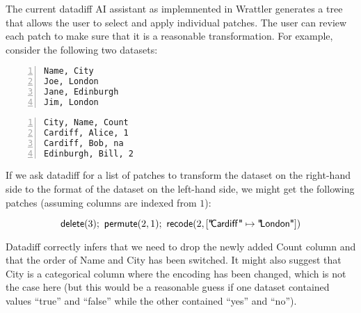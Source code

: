 \documentclass{article}
\begin{document}
The current datadiff AI assistant as implemnented in Wrattler generates a tree that allows the
user to select and apply individual patches. The user can review each patch to make sure that it
is a reasonable transformation. For example, consider the following two datasets:

\vspace{0.5em}
\begin{minipage}[t]{0.5\textwidth}
\begin{Verbatim}[numbers=left,xleftmargin=3mm]
Name, City
Joe, London
Jane, Edinburgh
Jim, London
\end{Verbatim}
\end{minipage}
\begin{minipage}[t]{0.5\textwidth}
\begin{Verbatim}[numbers=left,xleftmargin=3mm]
City, Name, Count
Cardiff, Alice, 1
Cardiff, Bob, na
Edinburgh, Bill, 2
\end{Verbatim}
\end{minipage}
\vspace{1em}

\noindent
If we ask datadiff for a list of patches to transform the dataset on the right-hand side
to the format of the dataset on the left-hand side, we might get the following patches
(assuming columns are indexed from $1$):

\[
\textnormal{\sffamily delete}(3);~ \textnormal{\sffamily permute}(2,1);~ \textnormal{\sffamily recode}(2, [\textnormal{\sffamily "\hspace{-0.2em}Cardiff\hspace{0.1em}"}\mapsto\textnormal{\sffamily "\hspace{-0.2em}London"}])
\]

\noindent
Datadiff correctly infers that we need to drop the newly added {\ttfamily Count} column and that
the order of {\ttfamily Name} and {\ttfamily City} has been switched. It might also suggest that
{\ttfamily City} is a categorical column where the encoding has been changed, which is not the 
case here (but this would be a reasonable guess if one dataset contained values ``true'' and ``false''
while the other contained ``yes'' and ``no'').
\end{document}
